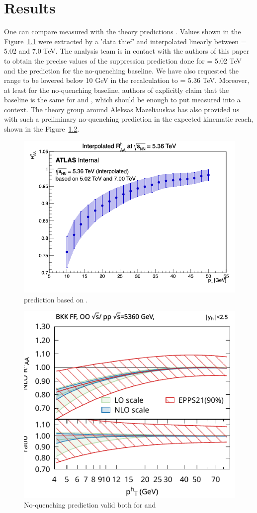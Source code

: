 \chapter{Results}
\label{chap:results}

One can compare measured \RAA with the theory predictions \cite{RAA_prediction}. Values shown in the Figure~\ref{fig:RAA_prediction} were extracted by a 'data thief' and interpolated linearly between \sqn = 5.02 and 7.0 TeV. The analysis team is in contact with the authors of this paper to obtain the precise values of the suppression prediction done for \sqn = 5.02 TeV and the prediction for the no-quenching baseline. We have also requested the \pT range to be lowered below 10 GeV in the recalculation to \sqn = 5.36 TeV. Moreover, at least for the no-quenching baseline, authors of \cite{RAA_prediction_6p8} explicitly claim that the baseline is the same for \OO and \NeNe, which should be enough to put measured \RAA into a context. The theory group around Aleksas Mazeliauskas has also provided us with such a preliminary no-quenching prediction in the expected kinematic reach, shown in the Figure~\ref{fig:RAA_no_quench}. 

\begin{figure}[h]
    \centering
    \includegraphics[width=0.7\linewidth]{images/RAA_prediction.png}
    \caption{\RAA prediction based on \cite{RAA_prediction}.}
    \label{fig:RAA_prediction}
\end{figure}

\begin{figure}[h]
    \centering
    \includegraphics[width=0.7\linewidth]{images/plot_LHC_hadron_OO_RAA_90.pdf}
    \caption{No-quenching \RAA prediction valid both for \OO and \NeNe}
    \label{fig:RAA_no_quench}
\end{figure}